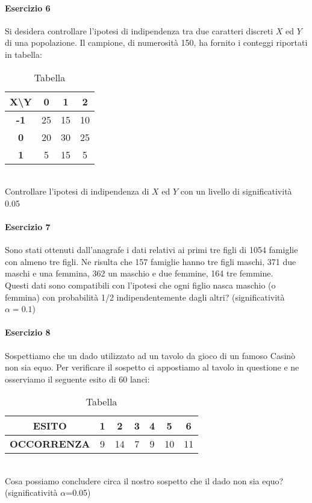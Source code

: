 \documentclass[12pt]{article}
\begin{document}
    \paragraph{Esercizio 6}
    Si desidera controllare l’ipotesi di indipendenza tra due caratteri discreti $X$ ed $Y$ di una popolazione. Il campione, di numerosità 150, ha fornito i conteggi riportati in tabella:
    \begin{table}[!htb]
        \centering
        \begin{tabular}{c|c|c|c|}
        \cline{2-4}
        \multicolumn{1}{l|}{X\textbackslash{}Y} & \textbf{0} & \textbf{1} & \textbf{2} \\ \hline
        \multicolumn{1}{|c|}{\textbf{-1}}       & 25         & 15         & 10         \\ \hline
        \multicolumn{1}{|c|}{\textbf{0}}        & 20         & 30         & 25         \\ \hline
        \multicolumn{1}{|c|}{\textbf{1}}        & 5          & 15         & 5          \\ \hline
        \end{tabular}
        \caption{Tabella}
        \label{tab:my-table6}
    \end{table}
    \\Controllare l’ipotesi di indipendenza di $X$ ed $Y$ con un livello di significatività 0.05
    \paragraph{Esercizio 7}
    Sono stati ottenuti dall’anagrafe i dati relativi ai primi tre figli di 1054 famiglie con almeno tre figli. Ne risulta che 157 famiglie hanno tre figli maschi, 371 due maschi e una femmina, 362 un maschio e due femmine, 164 tre femmine.
    \\Questi dati sono compatibili con l’ipotesi che ogni figlio nasca maschio (o femmina) con probabilità 1/2 indipendentemente dagli altri? (significatività $\alpha=0.1$)
    \newpage
    \paragraph{Esercizio 8}
    Sospettiamo che un dado utilizzato ad un tavolo da gioco di un famoso Casinò non sia equo. Per verificare il sospetto ci appostiamo al tavolo in questione e ne osserviamo il seguente esito di 60 lanci:
    \begin{table}[!htb]
        \centering
        \begin{tabular}{|c|c|c|c|c|c|c|}
        \hline
        \textbf{ESITO}      & 1 & 2  & 3 & 4 & 5  & 6  \\ \hline
        \textbf{OCCORRENZA} & 9 & 14 & 7 & 9 & 10 & 11 \\ \hline
        \end{tabular}
        \caption{Tabella}
        \label{tab:my-table7}
    \end{table}
    \\Cosa possiamo concludere circa il nostro sospetto che il dado non sia equo? (significatività $\alpha$=0.05)
\end{document}
